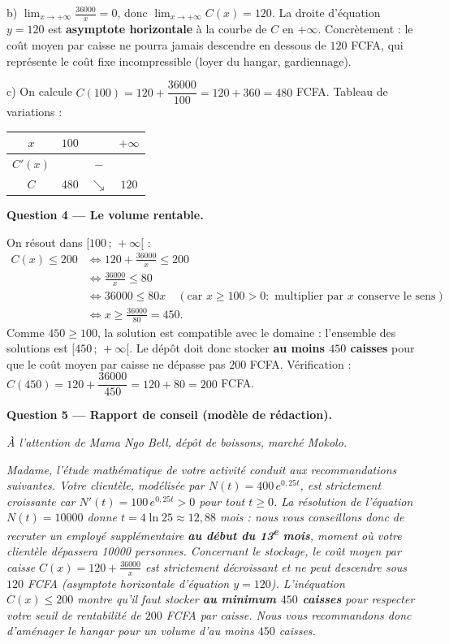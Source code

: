 \documentclass[11pt]{article}
\begin{document}
\begin{exoresolu}
b) $\displaystyle\lim_{x \to +\infty} \frac{36000}{x} = 0$, donc $\displaystyle\lim_{x \to +\infty} C(x) = 120$. La droite d'équation $y = 120$ est \textbf{asymptote horizontale} à la courbe de $C$ en $+\infty$. Concrètement : le coût moyen par caisse ne pourra jamais descendre en dessous de $120$ FCFA, qui représente le coût fixe incompressible (loyer du hangar, gardiennage).

c) On calcule $C(100) = 120 + \dfrac{36000}{100} = 120 + 360 = 480$ FCFA. Tableau de variations :

\begin{center}
\begin{tabular}{|c|ccc|}\hline
$x$ & $100$ & & $+\infty$ \\ \hline
$C'(x)$ & & $-$ & \\ \hline
$C$ & $480$ & $\searrow$ & $120$ \\ \hline
\end{tabular}
\end{center}

\textbf{Question 4 — Le volume rentable.}

On résout dans $[100\,;\,+\infty[$ :
\begin{align*}
C(x) \leq 200 &\iff 120 + \frac{36000}{x} \leq 200\\
&\iff \frac{36000}{x} \leq 80\\
&\iff 36000 \leq 80x \quad (\text{car } x \geq 100 > 0 : \text{ multiplier par } x \text{ conserve le sens})\\
&\iff x \geq \frac{36000}{80} = 450.
\end{align*}
Comme $450 \geq 100$, la solution est compatible avec le domaine : l'ensemble des solutions est $[450\,;\,+\infty[$. Le dépôt doit donc stocker \textbf{au moins $450$ caisses} pour que le coût moyen par caisse ne dépasse pas $200$ FCFA. Vérification : $C(450) = 120 + \dfrac{36000}{450} = 120 + 80 = 200$ FCFA.

\textbf{Question 5 — Rapport de conseil (modèle de rédaction).}

\emph{À l'attention de Mama Ngo Bell, dépôt de boissons, marché Mokolo.}

\emph{Madame, l'étude mathématique de votre activité conduit aux recommandations suivantes. Votre clientèle, modélisée par $N(t) = 400\,e^{0{,}25t}$, est strictement croissante car $N'(t) = 100\,e^{0{,}25t} > 0$ pour tout $t \geq 0$. La résolution de l'équation $N(t) = \num{10000}$ donne $t = 4\ln 25 \approx 12{,}88$ mois : nous vous conseillons donc de recruter un employé supplémentaire \textbf{au début du 13\textsuperscript{e} mois}, moment où votre clientèle dépassera \num{10000} personnes. Concernant le stockage, le coût moyen par caisse $C(x) = 120 + \frac{36000}{x}$ est strictement décroissant et ne peut descendre sous $120$ FCFA (asymptote horizontale d'équation $y = 120$). L'inéquation $C(x) \leq 200$ montre qu'il faut stocker \textbf{au minimum $450$ caisses} pour respecter votre seuil de rentabilité de $200$ FCFA par caisse. Nous vous recommandons donc d'aménager le hangar pour un volume d'au moins $450$ caisses.}
\end{exoresolu}
\end{document}
